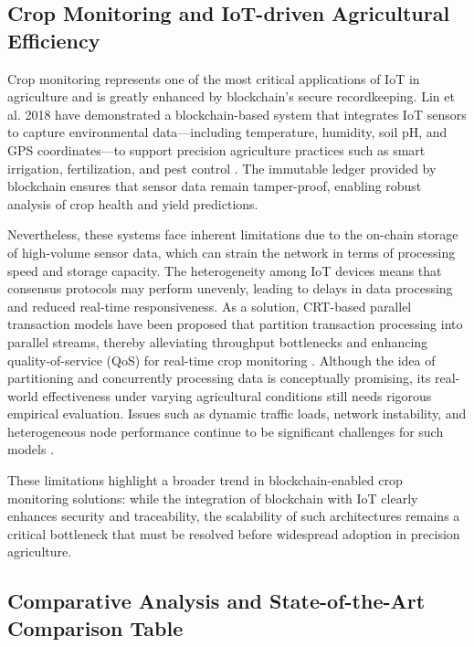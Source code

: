 \documentclass[12pt,onecolumn]{IEEEtran} %
\begin{document}
\subsection*{Crop Monitoring and IoT-driven Agricultural Efficiency}

Crop monitoring represents one of the most critical applications of IoT in agriculture and is greatly enhanced by blockchain's secure recordkeeping. Lin et al. 2018 have demonstrated a blockchain-based system that integrates IoT sensors to capture environmental data---including temperature, humidity, soil pH, and GPS coordinates---to support precision agriculture practices such as smart irrigation, fertilization, and pest control \cite{demestichas2020blockchaininagriculture, ali2022blockchainenabledarchitecture}. The immutable ledger provided by blockchain ensures that sensor data remain tamper-proof, enabling robust analysis of crop health and yield predictions.

Nevertheless, these systems face inherent limitations due to the on-chain storage of high-volume sensor data, which can strain the network in terms of processing speed and storage capacity. The heterogeneity among IoT devices means that consensus protocols may perform unevenly, leading to delays in data processing and reduced real-time responsiveness. As a solution, CRT-based parallel transaction models have been proposed that partition transaction processing into parallel streams, thereby alleviating throughput bottlenecks and enhancing quality-of-service (QoS) for real-time crop monitoring \cite{ali2022blockchainenabledarchitecture}. Although the idea of partitioning and concurrently processing data is conceptually promising, its real-world effectiveness under varying agricultural conditions still needs rigorous empirical evaluation. Issues such as dynamic traffic loads, network instability, and heterogeneous node performance continue to be significant challenges for such models \cite{ali2022blockchainenabledarchitecture}.

These limitations highlight a broader trend in blockchain-enabled crop monitoring solutions: while the integration of blockchain with IoT clearly enhances security and traceability, the scalability of such architectures remains a critical bottleneck that must be resolved before widespread adoption in precision agriculture.

\subsection*{Comparative Analysis and State-of-the-Art Comparison Table}
\end{document}
